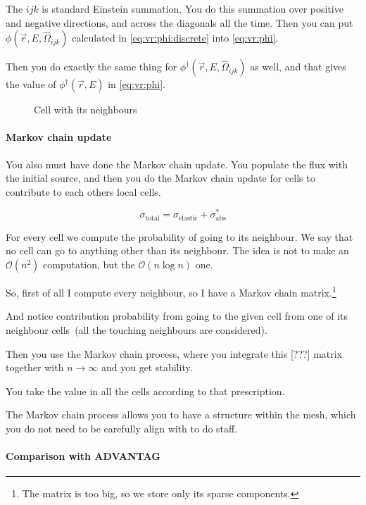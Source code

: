 The $ijk$ is standard Einstein summation. You do this summation over positive and negative directions, and across the diagonals all the time.
Then you can put $\phi(\vec{r},E,\hat\Omega_{ijk})$ calculated in \eqref{eq:vr:phi:discrete} into \eqref{eq:vr:phi}.

Then you do exactly the same thing for $\phi^\dag(\vec{r},E,\hat\Omega_{ijk})$ as well, and that gives the value of 
$\phi^\dag(\vec{r},E)$ in \eqref{eq:vr:phi}.


\begin{figure}
  \centering
  
  \caption{Cell with its neighbours}
  \label{fig:vr:cell}
\end{figure}

\paragraph{Markov chain update}
You also must have done the Markov chain update. You populate the flux with the initial source, and then you do the Markov chain update for cells to contribute to each others local cells.

$$
\sigma_\text{total} = \sigma_\text{elastic} + \sigma_\text{abs}^*
$$

For every cell we compute the probability of going to its neighbour. We say that no cell can go to anything other than its neighbour.
The idea is not to make an $\mathcal{O}(n^2)$ computation, but the $\mathcal{O}(n\log{}n)$ one.

So, first of all I compute every neighbour, so I have a Markov chain matrix.\footnote{The matrix is too big, so we store only its sparse components.} %

And notice contribution probability from going to the given cell from one of its neighbour cells~(all the touching neighbours are considered).

Then you use the Markov chain process, where you integrate this [\alert{???}] matrix together with $n\to\infty$ and you get stability.

You take the value in all the cells according to that prescription.


The Markov chain process allows you to have a structure within the mesh, which you do not need to be carefully align with to do staff.

\paragraph{Comparison with ADVANTAG}

